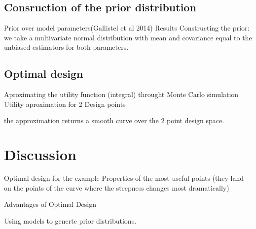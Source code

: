 \documentclass[preprint,review,12pt]{elsarticle}
\begin{document}
\subsection{Consruction of the prior distribution}

Prior over model parameters(Gallistel et al 2014)
Results
Constructing the prior: we take a multivariate normal distribution with mean and covariance equal to the unbiased estimators for both parameters.


\subsection{Optimal design}

Aproximating the utility function (integral) throught Monte Carlo simulation 
Utility aproximation for 2 Design points 

the approximation returns a smooth curve over the 2 point design space.

\section{Discussion}
\label{S:3}

Optimal design for the example
Properties of the most useful points (they land on the points of the curve where the steepness changes most dramatically)

Advantages of Optimal Design

Using models to generte prior distributions.













\end{document}

